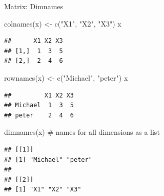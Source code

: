 \documentclass[
  9pt,
  ignorenonframetext,
]{beamer}
\newenvironment{Shaded}{\begin{snugshade}}{\end{snugshade}}
\newcommand{\CommentTok}[1]{\textcolor[rgb]{0.50,0.62,0.50}{#1}}
\newcommand{\KeywordTok}[1]{\textcolor[rgb]{0.94,0.87,0.69}{#1}}
\newcommand{\NormalTok}[1]{\textcolor[rgb]{0.80,0.80,0.80}{#1}}
\newcommand{\StringTok}[1]{\textcolor[rgb]{0.80,0.58,0.58}{#1}}
\begin{document}
\begin{frame}[fragile]{Matrix: Dimnames}
\protect\hypertarget{matrix-dimnames}{}
\begin{Shaded}
\begin{Highlighting}[]
\KeywordTok{colnames}\NormalTok{(x) \textless{}{-}}\StringTok{ }\KeywordTok{c}\NormalTok{(}\StringTok{"X1"}\NormalTok{, }\StringTok{"X2"}\NormalTok{, }\StringTok{"X3"}\NormalTok{)}
\NormalTok{x}
\end{Highlighting}
\end{Shaded}

\begin{verbatim}
##      X1 X2 X3
## [1,]  1  3  5
## [2,]  2  4  6
\end{verbatim}

\begin{Shaded}
\begin{Highlighting}[]
\KeywordTok{rownames}\NormalTok{(x) \textless{}{-}}\StringTok{ }\KeywordTok{c}\NormalTok{(}\StringTok{"Michael"}\NormalTok{, }\StringTok{"peter"}\NormalTok{)}
\NormalTok{x}
\end{Highlighting}
\end{Shaded}

\begin{verbatim}
##         X1 X2 X3
## Michael  1  3  5
## peter    2  4  6
\end{verbatim}

\begin{Shaded}
\begin{Highlighting}[]
\KeywordTok{dimnames}\NormalTok{(x) }\CommentTok{\# names for all dimensions as a list}
\end{Highlighting}
\end{Shaded}

\begin{verbatim}
## [[1]]
## [1] "Michael" "peter"  
## 
## [[2]]
## [1] "X1" "X2" "X3"
\end{verbatim}
\end{frame}
\end{document}
